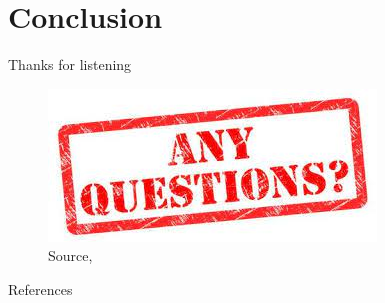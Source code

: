\documentclass{beamer}
\begin{document}
\section{Conclusion}

	
	\begin{frame}{Thanks for listening}
		\begin{figure}
			\includegraphics[width=0.6\linewidth]{any-questions.jpg}
			\caption{Source, \citet{any-Qs}}
		\end{figure}

	\end{frame}

	\begin{frame}{References}
		\tiny
		
	\end{frame}
\end{document}
